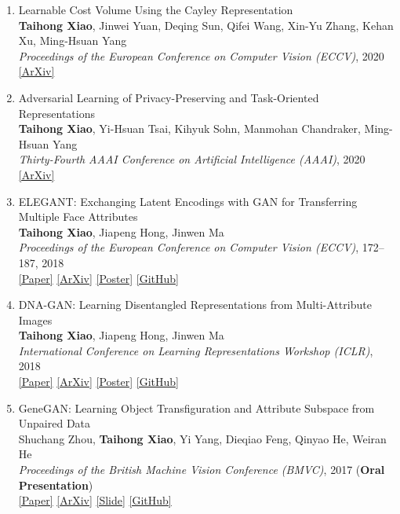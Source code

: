 \documentclass[letterpaper]{article}
\begin{document}
\begin{enumerate}
\item Learnable Cost Volume Using the Cayley Representation \\
	{\bf Taihong Xiao}, Jinwei Yuan, Deqing Sun, Qifei Wang, Xin-Yu Zhang, Kehan Xu,  Ming-Hsuan Yang\\
	{\it Proceedings of the European Conference on Computer Vision (ECCV)}, 2020 \\
	\href{https://arxiv.org/abs/2007.11431}{[ArXiv]}

\item Adversarial Learning of Privacy-Preserving and Task-Oriented Representations\\
	{\bf Taihong Xiao}, Yi-Hsuan Tsai, Kihyuk Sohn, Manmohan Chandraker, Ming-Hsuan Yang\\
	{\it Thirty-Fourth AAAI Conference on Artificial Intelligence (AAAI)}, 2020\\
	\href{https://arxiv.org/abs/1911.10143}{[ArXiv]}

\item ELEGANT: Exchanging Latent Encodings with GAN for Transferring Multiple Face Attributes\\
	{\bf Taihong Xiao}, Jiapeng Hong, Jinwen Ma\\
	{\it Proceedings of the European Conference on Computer Vision (ECCV)}, 172--187, 2018\\
	\href{http://openaccess.thecvf.com/content_ECCV_2018/papers/Taihong_Xiao_ELEGANT_Exchanging_Latent_ECCV_2018_paper.pdf}{[Paper]}
	\href{https://arxiv.org/abs/1803.10562}{[ArXiv]}
	\href{https://prinsphield.github.io/ECCV-2018/poster/poster.pdf}{[Poster]}
	\href{https://github.com/Prinsphield/ELEGANT}{[GitHub]}
	
\item DNA-GAN: Learning Disentangled Representations from Multi-Attribute Images\\
	{\bf Taihong Xiao}, Jiapeng Hong, Jinwen Ma\\
	{\it International Conference on Learning Representations Workshop (ICLR)}, 2018\\
	\href{https://openreview.net/pdf?id=rkX1FF_UM}{[Paper]} 
	\href{https://arxiv.org/abs/1711.05415v2}{[ArXiv]}
	\href{https://prinsphield.github.io/ICLR-2018/poster/poster.pdf}{[Poster]}
	\href{https://github.com/Prinsphield/DNA-GAN}{[GitHub]}
	
\item GeneGAN: Learning Object Transfiguration and Attribute Subspace from Unpaired Data\\
	Shuchang Zhou, {\bf Taihong Xiao}, Yi Yang, Dieqiao Feng, Qinyao He, Weiran He\\
	{\it Proceedings of the British Machine Vision Conference (BMVC)}, 2017 ({\bf Oral Presentation})\\
	\href{https://www.dropbox.com/s/3qofizvcfi4pa0f/0520.pdf?dl=1}{[Paper]}
	\href{http://arxiv.org/abs/1705.04932}{[ArXiv]}
	\href{http://zsc.github.io/GeneGAN-BMVC2017.pdf}{[Slide]}
	\href{https://github.com/Prinsphield/GeneGAN}{[GitHub]}


\end{enumerate}
\end{document}
